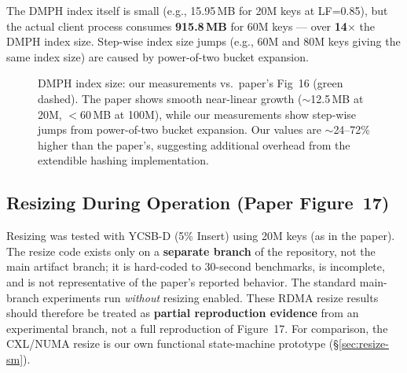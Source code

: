 \documentclass[conference]{IEEEtran}
\begin{document}
The DMPH index itself is small (e.g., 15.95\,MB for 20M keys at LF=0.85), but the actual client process consumes \textbf{915.8\,MB} for 60M keys --- over \textbf{14$\times$} the DMPH index size. Step-wise index size jumps (e.g., 60M and 80M keys giving the same index size) are caused by power-of-two bucket expansion.

\begin{figure}[H]
\centering
{}
\caption{DMPH index size: our measurements vs.\ paper's Fig~16 (green dashed). The paper shows smooth near-linear growth ($\sim$12.5\,MB at 20M, $<$60\,MB at 100M), while our measurements show step-wise jumps from power-of-two bucket expansion. Our values are $\sim$24--72\% higher than the paper's, suggesting additional overhead from the extendible hashing implementation.}
\label{fig:rdma-memory}
\end{figure}

\subsection{Resizing During Operation (Paper Figure~17)}\label{sec:repro-resize}

Resizing was tested with YCSB-D (5\% Insert) using 20M keys (as in the paper). The resize code exists only on a \textbf{separate branch} of the repository, not the main artifact branch; it is hard-coded to 30-second benchmarks, is incomplete, and is not representative of the paper's reported behavior. The standard main-branch experiments run \emph{without} resizing enabled. These RDMA resize results should therefore be treated as \textbf{partial reproduction evidence} from an experimental branch, not a full reproduction of Figure~17. For comparison, the CXL/NUMA resize is our own functional state-machine prototype (\S\ref{sec:resize-sm}).
\end{document}
